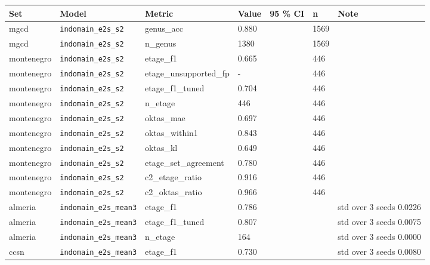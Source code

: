 \begin{center}{\scriptsize\setlength{\tabcolsep}{3pt}
\begin{tabular}{lllllll}
\toprule
Set & Model & Metric & Value & 95 \% CI & n & Note \\
\midrule
mgcd & \texttt{indomain\_\allowbreak{}e2s\_\allowbreak{}s2} & genus\_acc & 0.880 &  & 1569 &  \\
mgcd & \texttt{indomain\_\allowbreak{}e2s\_\allowbreak{}s2} & n\_genus & 1380 &  & 1569 &  \\
montenegro & \texttt{indomain\_\allowbreak{}e2s\_\allowbreak{}s2} & etage\_f1 & 0.665 &  & 446 &  \\
montenegro & \texttt{indomain\_\allowbreak{}e2s\_\allowbreak{}s2} & etage\_unsupported\_fp & - &  & 446 &  \\
montenegro & \texttt{indomain\_\allowbreak{}e2s\_\allowbreak{}s2} & etage\_f1\_tuned & 0.704 &  & 446 &  \\
montenegro & \texttt{indomain\_\allowbreak{}e2s\_\allowbreak{}s2} & n\_etage & 446 &  & 446 &  \\
montenegro & \texttt{indomain\_\allowbreak{}e2s\_\allowbreak{}s2} & oktas\_mae & 0.697 &  & 446 &  \\
montenegro & \texttt{indomain\_\allowbreak{}e2s\_\allowbreak{}s2} & oktas\_within1 & 0.843 &  & 446 &  \\
montenegro & \texttt{indomain\_\allowbreak{}e2s\_\allowbreak{}s2} & oktas\_kl & 0.649 &  & 446 &  \\
montenegro & \texttt{indomain\_\allowbreak{}e2s\_\allowbreak{}s2} & etage\_set\_agreement & 0.780 &  & 446 &  \\
montenegro & \texttt{indomain\_\allowbreak{}e2s\_\allowbreak{}s2} & c2\_etage\_ratio & 0.916 &  & 446 &  \\
montenegro & \texttt{indomain\_\allowbreak{}e2s\_\allowbreak{}s2} & c2\_oktas\_ratio & 0.966 &  & 446 &  \\
almeria & \texttt{indomain\_\allowbreak{}e2s\_\allowbreak{}mean3} & etage\_f1 & 0.786 &  &  & std over 3 seeds 0.0226 \\
almeria & \texttt{indomain\_\allowbreak{}e2s\_\allowbreak{}mean3} & etage\_f1\_tuned & 0.807 &  &  & std over 3 seeds 0.0075 \\
almeria & \texttt{indomain\_\allowbreak{}e2s\_\allowbreak{}mean3} & n\_etage & 164 &  &  & std over 3 seeds 0.0000 \\
ccsn & \texttt{indomain\_\allowbreak{}e2s\_\allowbreak{}mean3} & etage\_f1 & 0.730 &  &  & std over 3 seeds 0.0080 \\

\end{tabular}}
\end{center}
